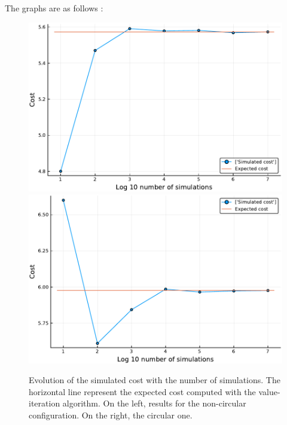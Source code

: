 The graphs are as follows :

\begin{figure}[H]
\centering
\includegraphics[scale=0.41]{../img/board_magic/cost_iterations_log_noncirc.pdf}
\includegraphics[scale=0.41]{../img/board_magic/cost_iterations_log_circ.pdf}
\caption{Evolution of the simulated cost with the number of simulations. The horizontal line represent the expected cost computed with the value-iteration algorithm. On the left, results for the non-circular configuration. On the right, the circular one.}
\label{fig:cost_iterations_log_magic}
\end{figure}

